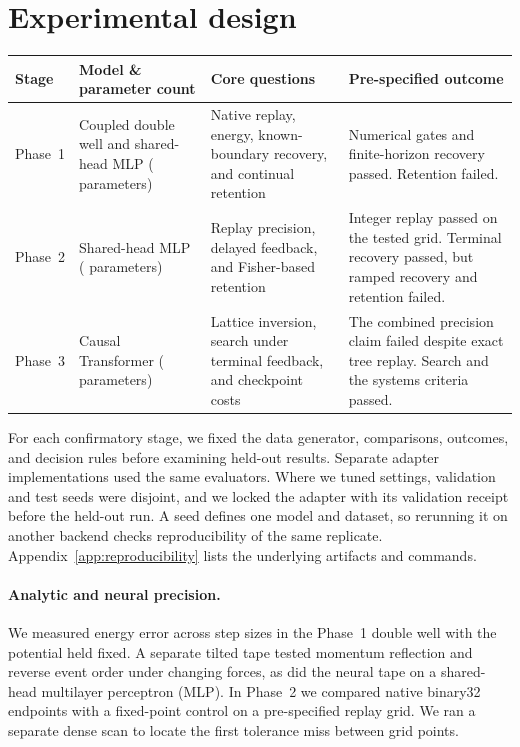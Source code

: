 \section{Experimental design}
\label{sec:protocols}

\begin{center}
\small
\begin{tabularx}{\textwidth}{@{}l
  >{\raggedright\arraybackslash}p{}
  >{\raggedright\arraybackslash}p{}
  >{\raggedright\arraybackslash}X@{}}
\toprule
Stage & Model \& parameter count & Core questions & Pre-specified outcome \\
\midrule
Phase~1 & Coupled double well and shared-head MLP (\PoneDimensions{} parameters) &
Native replay, energy, known-boundary recovery, and continual retention &
Numerical gates and finite-horizon recovery passed. Retention failed. \\
\addlinespace
Phase~2 & Shared-head MLP (\PoneDimensions{} parameters) &
Replay precision, delayed feedback, and Fisher-based retention &
Integer replay passed on the tested grid. Terminal recovery passed, but ramped recovery and retention failed. \\
\addlinespace
Phase~3 & Causal Transformer (\PthreeParams{} parameters) &
Lattice inversion, search under terminal feedback, and checkpoint costs &
The combined precision claim failed despite exact tree replay. Search and the systems criteria passed. \\
\bottomrule
\end{tabularx}
\end{center}

For each confirmatory stage, we fixed the data generator, comparisons,
outcomes, and decision rules before examining held-out results. Separate
adapter implementations used the same evaluators. Where we tuned
settings, validation and test seeds were disjoint, and we locked the
adapter with its validation receipt before the held-out run. A seed
defines one model and dataset, so rerunning it on another backend checks
reproducibility of the same replicate. Appendix~\ref{app:reproducibility}
lists the underlying artifacts and commands.

\paragraph{Analytic and neural precision.}
We measured energy error across step sizes in the Phase~1 double well
with the potential held fixed. A separate tilted tape tested momentum
reflection and reverse event order under changing forces, as did the
neural tape on a shared-head multilayer perceptron (MLP). In Phase~2
we compared native binary32 endpoints with a fixed-point control on
a pre-specified replay grid. We ran a separate dense scan to locate the
first tolerance miss between grid points.

